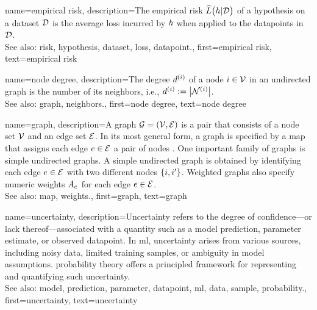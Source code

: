 {name={empirical risk},
  description={The empirical \gls{risk} $\widehat{L}\big(h|\mathcal{D}\big)$ 
  	of a \gls{hypothesis} on a \gls{dataset} $\mathcal{D}$ is the average \gls{loss} incurred 
  	by $h$ when applied to the \glspl{datapoint} in $\mathcal{D}$.
				\\ 
		See also: \gls{risk}, \gls{hypothesis}, \gls{dataset}, \gls{loss}, \gls{datapoint}.},
  first={empirical risk},
  text={empirical risk} 
}

{name={node degree},
	description={The degree $d^{(i)}$ of a node $i \in \mathcal{V}$ 
		in an undirected \gls{graph} is the number of its \gls{neighbors}, i.e., $d^{(i)} := \big|\mathcal{N}^{(i)}\big|$.
					\\ 
		See also: \gls{graph}, \gls{neighbors}.},
	first={node degree},
	text={node degree} 
}

{name={graph},
	description={A graph $\mathcal{G} = \left( \mathcal{V},\mathcal{E} \right)$ is a pair that consists of 
		a node set $\mathcal{V}$ and an edge set $\mathcal{E}$. In its most general form, a graph is 
		specified by a \gls{map} that assigns each edge $e \in \mathcal{E}$ a pair of nodes \cite{RockNetworks}. 
		One important family of graphs is simple undirected graphs. A simple undirected graph 
		is obtained by identifying each edge $e \in \mathcal{E}$ with two different nodes $\{i,i'\}$. 
		Weighted graphs also specify numeric \gls{weights} $A_{e}$ for each 
		edge $e \in \mathcal{E}$.
					\\ 
		See also: \gls{map}, \gls{weights}.},
	first={graph},
	text={graph} 
}

{name={uncertainty},
	description={Uncertainty refers to the degree of confidence—or 
		lack thereof—associated with a quantity such as a \gls{model} \gls{prediction}, \gls{parameter} estimate, or 
		observed \gls{datapoint}. In \gls{ml}, uncertainty arises from various sources, including 
		noisy \gls{data}, limited training \glspl{sample}, or ambiguity in \gls{model} assumptions. \Gls{probability} theory 
		offers a principled framework for representing and quantifying such uncertainty.
					\\ 
		See also: \gls{model}, \gls{prediction}, \gls{parameter}, \gls{datapoint}, \gls{ml}, \gls{data}, \gls{sample}, \gls{probability}.},
	first={uncertainty},
	text={uncertainty}
}

